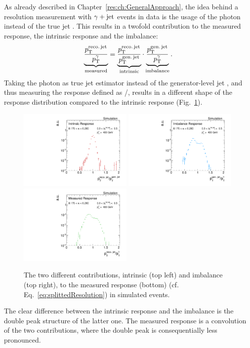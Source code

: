 As already described in Chapter~\ref{res:ch:GeneralApproach}, the idea behind a resolution measurement with $\gamma + \text{jet}$ events in data is the usage of the photon \pt instead of the true jet \pt.
This results in a twofold contribution to the measured response, the intrinsic response and the imbalance:
\begin{equation}\label{eq:splittedResolution}
\underbrace{\frac{{p}_\mathrm{T}^{\text{reco.\,jet}}}{{p}_\mathrm{T}^{\gamma}}}_{\text{measured}} = \underbrace{\frac{{p}_\mathrm{T}^{\text{reco.\,jet}}}{{p}_\mathrm{T}^{\text{gen.\,jet}}}}_{\text{intrinsic}} \cdot \underbrace{\frac{{p}_\mathrm{T}^{\text{gen.\,jet}}}{{p}_\mathrm{T}^{\gamma}}}_{\text{imbalance}}.
\end{equation}
Taking the photon \pt as true jet \pt estimator instead of the generator-level jet \pt, and thus measuring the response defined as \ptrecojet/\ptgamma, results in a different shape of the response distribution compared to the intrinsic response (Fig.~\ref{fig:responseExamples}). 
\begin{figure}[b]
 \centering
     \includegraphics[width=0.49\textwidth]{figures/resolution/methodology/intrinsicResponse_6_alpha_bin.pdf}
     \includegraphics[width=0.49\textwidth]{figures/resolution/methodology/imbalanceResponse_6_alpha_bin.pdf}\\
     \includegraphics[width=0.49\textwidth]{figures/resolution/methodology/fullResponse_6_alpha_bin.pdf}
  \caption{The two different contributions, intrinsic (top left) and imbalance (top right), to the measured response (bottom) (cf. Eq.~\eqref{eq:splittedResolution}) in simulated events.}  
 \label{fig:responseExamples}
\end{figure}
The clear difference between the intrinsic response and the imbalance is the double peak structure of the latter one. The measured response is a convolution of the two
contributions, where the double peak is consequentially less pronounced.

